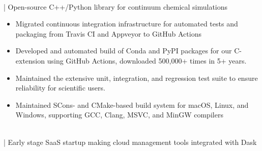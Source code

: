 \\
 | Open-source C++/Python library for continuum chemical simulations

\begin{itemize}
\item Migrated continuous integration infrastructure for automated tests and packaging from Travis CI and Appveyor to GitHub Actions
\item Developed and automated build of Conda and PyPI packages for our C-extension using GitHub Actions, downloaded 500,000+ times in 5+ years.
\item Maintained the extensive unit, integration, and regression test suite to ensure reliability for scientific users.
\item Maintained SCons- and CMake-based build system for macOS, Linux, and Windows, supporting GCC, Clang, MSVC, and MinGW compilers
\end{itemize}
\newpage

\\
 | Early stage SaaS startup making cloud management tools integrated with Dask

